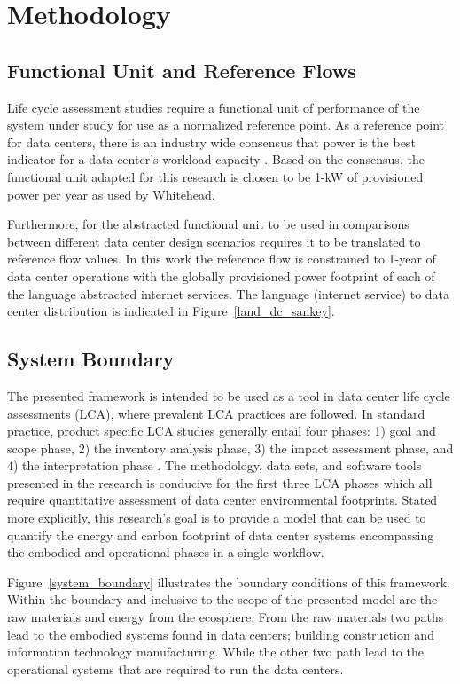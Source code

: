 \section{Methodology}
    \subsection{Functional Unit and Reference Flows}
    Life cycle assessment studies require a functional unit of performance of the system under study for use as a normalized reference point. As a reference point for data centers, there is an industry wide consensus that power is the best indicator for a data center's workload capacity \cite{shah11, whitehead15, barroso18}. Based on the consensus, the functional unit adapted for this research is chosen to be 1-kW of provisioned power per year as used by Whitehead. 
    
    Furthermore, for the abstracted functional unit to be used in comparisons between different data center design scenarios requires it to be translated to reference flow values. In this work the reference flow is constrained to 1-year of data center operations with the globally provisioned power footprint of each of the language abstracted internet services. The language (internet service) to data center distribution is indicated in Figure~\ref{land_dc_sankey}. 
    
    
    
    \subsection{System Boundary}
    The presented framework is intended to be used as a tool in data center life cycle assessments (LCA), where prevalent LCA practices are followed. In standard practice, product specific LCA studies generally entail four phases: 1) goal and scope phase, 2) the inventory analysis phase, 3) the impact assessment phase, and 4) the interpretation phase \cite{ISO14040}. The methodology, data sets, and software tools presented in the research is conducive for the first three LCA phases which all require quantitative assessment of data center environmental footprints. Stated more explicitly, this research’s goal is to provide a model that can be used to quantify the energy and carbon footprint of data center systems encompassing the embodied and operational phases in a single workflow. 
    
    Figure~\ref{system_boundary} illustrates the boundary conditions of this framework. Within the boundary and inclusive to the scope of the presented model are the raw materials and energy from the ecosphere. From the raw materials two paths lead to the embodied systems found in data centers; building construction and information technology manufacturing. While the other two path lead to the operational systems that are required to run the data centers. 
    
